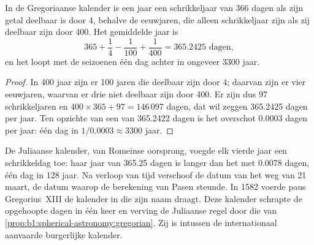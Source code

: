 \begin{proposition}\label{prop:b1:spherical-astronomy:gregorian}
In de Gregoriaanse kalender is een jaar een schrikkeljaar van 366 dagen als zijn
getal deelbaar is door 4, behalve de eeuwjaren, die alleen schrikkeljaar zijn
als zij deelbaar zijn door 400. Het gemiddelde jaar is
\[
  365 + \frac14 - \frac1{100} + \frac1{400} = \num{365.2425}\text{ dagen},
\]
en het loopt met de seizoenen één dag achter in ongeveer 3300 jaar.
\end{proposition}

\begin{proof}
In 400 jaar zijn er 100 jaren die deelbaar zijn door 4; daarvan zijn er vier
eeuwjaren, waarvan er drie niet deelbaar zijn door 400. Er zijn dus 97
schrikkeljaren en $400\times 365 + 97 = 146\,097$ dagen, dat wil zeggen
365.2425 dagen per jaar. Ten opzichte van een  van 365.2422 dagen
is het overschot 0.0003 dagen per jaar: één dag in $1/0.0003 \approx 3300$ jaar.
\end{proof}

\begin{history}
De Juliaanse kalender, van Romeinse oorsprong, voegde elk vierde jaar een
schrikkeldag toe: haar jaar van 365.25 dagen is langer dan het  met
0.0078 dagen, één dag in 128 jaar. Na verloop van tijd verschoof de datum van
het  weg van 21 maart, de datum waarop de berekening van Pasen steunde.
In 1582 voerde paus Gregorius~XIII de kalender in die zijn naam draagt. Deze
kalender schrapte de opgehoopte dagen in één keer en verving de Juliaanse regel
door die van \cref{prop:b1:spherical-astronomy:gregorian}. Zij is intussen de
internationaal aanvaarde burgerlijke kalender.
\end{history}

